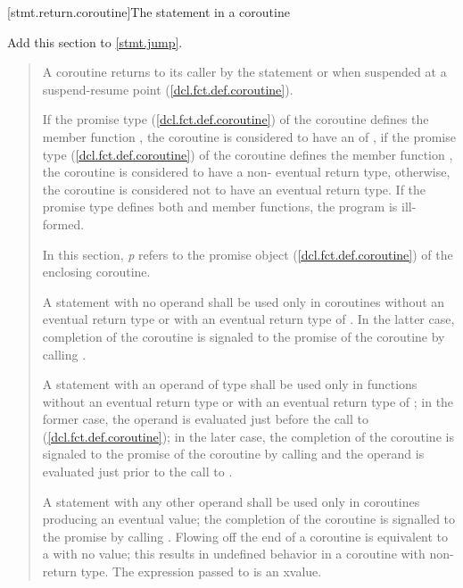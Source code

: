 [stmt.return.coroutine]{The  statement in a coroutine}%

Add this section to \ref{stmt.jump}.

\begin{quote}

\pnum
A coroutine returns to its caller by the  statement
or when suspended at a suspend-resume point (\ref{dcl.fct.def.coroutine}). 

\pnum
  If the promise type (\ref{dcl.fct.def.coroutine}) of the coroutine defines the member function , the coroutine is considered to have an  of , if the promise type (\ref{dcl.fct.def.coroutine}) of the coroutine defines the member function , the coroutine is considered to have a non- eventual return  type, otherwise, the coroutine is considered not to have an eventual return type. If the promise type defines both  and  member functions, the program is ill-formed.

\pnum
In this section, \textit{p} refers to the promise object  
(\ref{dcl.fct.def.coroutine})
of the enclosing coroutine.

\pnum
A  statement
with no operand shall be used only in coroutines
without an eventual return type or with an eventual return type of . In the latter case, completion of the coroutine
is signaled to the promise of the coroutine by calling .

\pnum
A  statement with an operand of type  shall be used only in functions without an eventual return type 
or with an eventual return type of ; in the former case, the operand is evaluated just before the call to   (\ref{dcl.fct.def.coroutine}); in the later case, the completion of the coroutine is signaled to the promise of the coroutine by calling  and the operand is evaluated just prior to the call to . 

\pnum
A  statement with any other operand shall be used only
in coroutines producing an eventual value; the completion of the coroutine is signalled to the promise by calling \linebreak 
{}.
Flowing off the end of a coroutine is equivalent to a  with no value; this results in undefined behavior in a coroutine with non- return type.
\enternote
The expression passed to  is an xvalue.
\exitnote





\end{quote}

